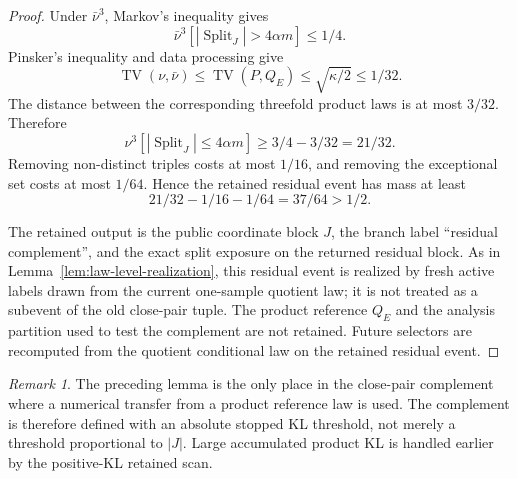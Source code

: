 \documentclass[11pt]{article}
\theoremstyle{remark}
\newtheorem{remark}[theorem]{Remark}
\newcommand{\Split}{\operatorname{Split}}
\newcommand{\TV}{\operatorname{TV}}
\begin{document}
\begin{proof}
Under $\bar\nu^3$, Markov's inequality gives
\[
        \bar\nu^3[|\Split_J|>4\alpha m]\le 1/4.
\]
Pinsker's inequality and data processing give
\[
        \TV(\nu,\bar\nu)\le \TV(P,Q_E)\le \sqrt{\kappa/2}\le 1/32.
\]
The distance between the corresponding threefold product laws is at most $3/32$.  Therefore
\[
        \nu^3[|\Split_J|\le4\alpha m]\ge 3/4-3/32=21/32.
\]
Removing non-distinct triples costs at most $1/16$, and removing the exceptional set costs at most $1/64$.  Hence the retained residual event has mass at least
\[
        21/32-1/16-1/64=37/64>1/2.
\]

The retained output is the public coordinate block $J$, the branch label ``residual complement'', and the exact split exposure on the returned residual block.  As in Lemma~\ref{lem:law-level-realization}, this residual event is realized by fresh active labels drawn from the current one-sample quotient law; it is not treated as a subevent of the old close-pair tuple.  The product reference $Q_E$ and the analysis partition used to test the complement are not retained.  Future selectors are recomputed from the quotient conditional law on the retained residual event.
\end{proof}

\begin{remark}
The preceding lemma is the only place in the close-pair complement where a numerical transfer from a product reference law is used.  The complement is therefore defined with an absolute stopped KL threshold, not merely a threshold proportional to $|J|$.  Large accumulated product KL is handled earlier by the positive-KL retained scan.
\end{remark}
\end{document}
